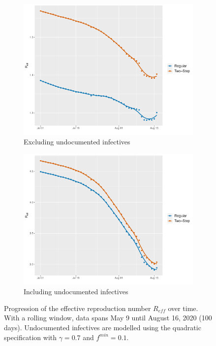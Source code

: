 \documentclass[12pt]{article}
\begin{document}
\begin{appendices}
		\begin{figure}[H]
    	    \centering
    	    \begin{subfigure}{0.495\textwidth}
    	      \centering
    	      \includegraphics[width=\linewidth]{output/panel_data_lag14_Reff_rolling.pdf}
    	      \caption{Excluding undocumented infectives}
    	      \label{fig:Reff_over_time_panel_data}
    	    \end{subfigure}
    	    \begin{subfigure}{0.495\textwidth}
    	      \centering
    	      \includegraphics[width=\linewidth]{output/panel_data_lag14_Reff_UndocQuadratic_rolling.pdf}
    	      \caption{Including undocumented infectives}
    	      \label{fig:Reff_over_time_panel_data_undoc_rolling}
    	    \end{subfigure}
    	    \caption{Progression of the effective reproduction number $R_{eff}$ over time. With a rolling window, data spans May 9 until August 16, 2020 (100 days). Undocumented infectives are modelled using the quadratic specification with $\gamma = 0.7$ and $f^{min}=0.1$.}
    	    \label{fig:Reff_over_time_panel_data_all}
    	\end{figure}
		

\end{appendices}
\end{document}
